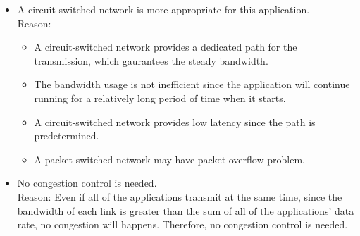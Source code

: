 \begin{pr}$ $
\begin{itemize}
\item A circuit-switched network is more appropriate for this application.\\
Reason:
\begin{itemize}
\item A circuit-switched network provides a dedicated path for the transmission, which gaurantees the steady bandwidth.
\item The bandwidth usage is not inefficient since the application will continue running for a relatively long period of time when it starts.
\item A circuit-switched network provides low latency since the path is predetermined.
\item A packet-switched network may have packet-overflow problem.
\end{itemize}
\item No congestion control is needed.\\
Reason: Even if all of the applications transmit at the same time, since the bandwidth of each link is greater than the sum of all of the applications' data rate, no congestion will happens. Therefore, no congestion control is needed.
\end{itemize}
\end{pr}
